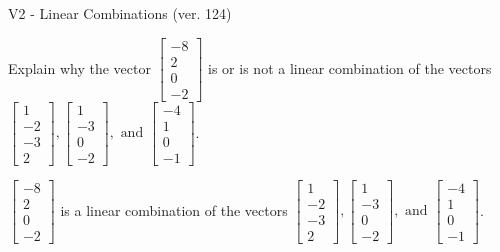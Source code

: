 \begin{exercise}
  \begin{exerciseTitle}V2 - Linear Combinations (ver. 124)\end{exerciseTitle}
  \begin{exerciseStatement}
    Explain why the vector \(\left[\begin{array}{c}
-8 \\
2 \\
0 \\
-2
\end{array}\right]\)  is or is not a linear 
	combination of the vectors \(\left[\begin{array}{c}
1 \\
-2 \\
-3 \\
2
\end{array}\right] , \left[\begin{array}{c}
1 \\
-3 \\
0 \\
-2
\end{array}\right] , \text{ and } \left[\begin{array}{c}
-4 \\
1 \\
0 \\
-1
\end{array}\right]\).
	


  \end{exerciseStatement}
  \begin{exerciseAnswer}
   \(\left[\begin{array}{c}
-8 \\
2 \\
0 \\
-2
\end{array}\right]\) 
  	 is  
	a linear combination of the vectors \(\left[\begin{array}{c}
1 \\
-2 \\
-3 \\
2
\end{array}\right] , \left[\begin{array}{c}
1 \\
-3 \\
0 \\
-2
\end{array}\right] , \text{ and } \left[\begin{array}{c}
-4 \\
1 \\
0 \\
-1
\end{array}\right]\).

	
  


  \end{exerciseAnswer}
\end{exercise}
